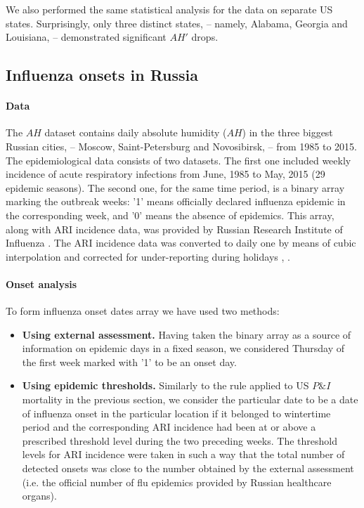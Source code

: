 \documentclass[3p,times,procedia]{elsarticle}
\begin{document}
We also performed the same statistical analysis for the data on separate US states. Surprisingly, only three distinct states, -- namely, Alabama, Georgia and Louisiana, -- demonstrated significant $AH'$ drops.


\subsection{Influenza onsets in Russia}

\paragraph{Data}
The $AH$ dataset contains daily absolute humidity ($AH$) in the three biggest Russian cities, -- Moscow, Saint-Petersburg and Novosibirsk, -- from 1985 to 2015. The epidemiological data consists of two datasets. The first one included weekly incidence of acute respiratory infections from June, 1985 to May, 2015 (29 epidemic seasons). The second one, for the same time period, is a binary array marking the outbreak weeks: '1' means officially declared influenza epidemic in the corresponding week, and '0' means the absence of epidemics. This array, along with ARI incidence data, was provided by Russian Research Institute of Influenza \cite{fluinst_link}. The ARI incidence data was converted to daily one by means of cubic interpolation and corrected for under-reporting during holidays \cite{baroyan1970computer}, \cite{Leonenko2016}.

\paragraph{Onset analysis} To form influenza onset dates array we have used two methods:
\begin{itemize}
\item \textbf{Using external assessment.} Having taken the binary array as a source of information on epidemic days in a fixed season, we considered Thursday of the first week marked with '1' to be an onset day.
\item \textbf{Using epidemic thresholds.} Similarly to the rule applied to US $P\&I$ mortality in the previous section, we consider the particular date to be a date of influenza onset in the particular location if it belonged to wintertime period and the corresponding ARI incidence had been at or above a prescribed threshold level during the two preceding weeks. The threshold levels for ARI incidence were taken in such a way that the total number of detected onsets was close to the number obtained by the external assessment (i.e. the official number of flu epidemics provided by Russian healthcare organs).
\end{itemize}
\end{document}
